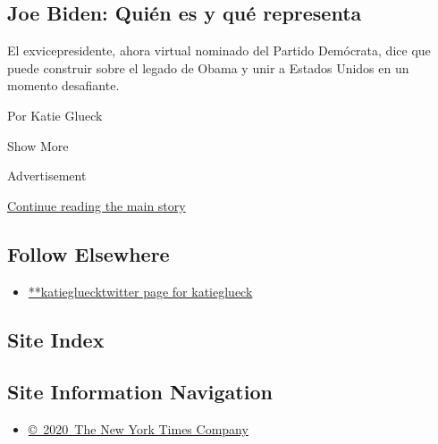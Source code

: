 \begin{enumerate}
  \hypertarget{joe-biden-quiuxe9n-es-y-quuxe9-representa}{%
  \subsection{Joe Biden: Quién es y qué
  representa}\label{joe-biden-quiuxe9n-es-y-quuxe9-representa}}

  El exvicepresidente, ahora virtual nominado del Partido Demócrata,
  dice que puede construir sobre el legado de Obama y unir a Estados
  Unidos en un momento desafiante.

  Por Katie Glueck
\end{enumerate}

Show More

Advertisement

\protect\hyperlink{after-mid2}{Continue reading the main story}

\hypertarget{follow-elsewhere}{%
\subsection{Follow Elsewhere}\label{follow-elsewhere}}

\begin{itemize}
\tightlist
\item
  \href{https://twitter.com/katieglueck}{**katiegluecktwitter page for
  katieglueck}
\end{itemize}

\hypertarget{site-index}{%
\subsection{Site Index}\label{site-index}}

\hypertarget{site-information-navigation}{%
\subsection{Site Information
Navigation}\label{site-information-navigation}}

\begin{itemize}
\tightlist
\item
  \href{https://help.nytimes.com/hc/en-us/articles/115014792127-Copyright-notice}{©~2020~The
  New York Times Company}
\end{itemize}

